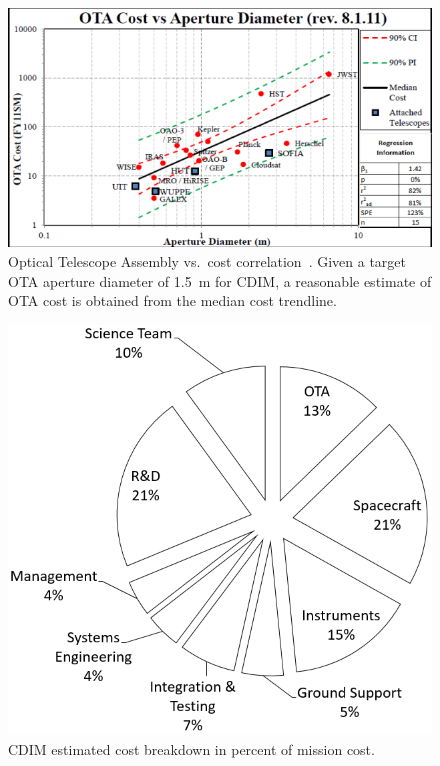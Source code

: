 \documentclass{ws-jai}
\begin{document}
\begin{figure}[!h]
    \centering
    \includegraphics[width=.8\linewidth]{figs/ota_cost-diameter_stahl2010.png}
    \caption{Optical Telescope Assembly vs.\ cost correlation~\cite{stahl2013}. Given a target OTA aperture diameter of \SI{1.5}{\meter} for CDIM, a reasonable estimate of OTA cost is obtained from the median cost trendline.
\label{fig:cost-stahl-ota-cost-vs-diameter}
}
\end{figure}

\begin{figure}[!h]
  \centering
    \centering
    \includegraphics[width=.6\linewidth]{figs/cost-breakdown-pie.png}
    \caption{CDIM estimated cost breakdown in percent of mission cost.
\label{fig:cost-breakdown}
}
\end{figure}

\end{document}
